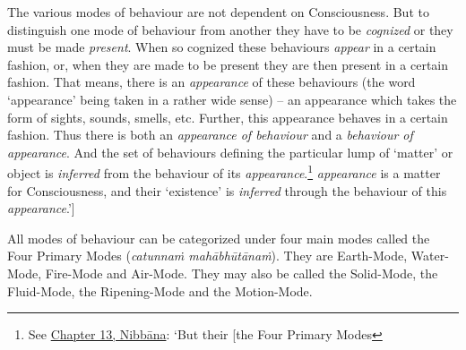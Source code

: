The various modes of behaviour are not dependent on Consciousness. But to distinguish one mode of behaviour from another they have to be \emph{cognized} or they must be made \emph{present}. When so cognized these behaviours \emph{appear} in a certain fashion, or, when they are made to be present they are then present in a certain fashion. That means, there is an \emph{appearance} of these behaviours (the word `appearance' being taken in a rather wide sense) -- an appearance which takes the form of sights, sounds, smells, etc. Further, this appearance behaves in a certain fashion. Thus there is both an \emph{appearance of behaviour} and a \emph{behaviour of appearance}. And the set of behaviours defining the particular lump of `matter' or object is \emph{inferred} from the behaviour of its \emph{appearance}.\footnote{See \href{ch-13-nibbana.xml\#the-four-primary}{Chapter 13, Nibbāna}: `But their {[}the Four Primary Modes} \emph{appearance} is a matter for Consciousness, and their `existence' is \emph{inferred} through the behaviour of this \emph{appearance}.'{]}

All modes of behaviour can be categorized under four main modes called the Four Primary Modes (\textit{catunnaṁ mahābhūtānaṁ}). They are Earth-Mode, Water-Mode, Fire-Mode and Air-Mode. They may also be called the Solid-Mode, the Fluid-Mode, the Ripening-Mode and the Motion-Mode.

